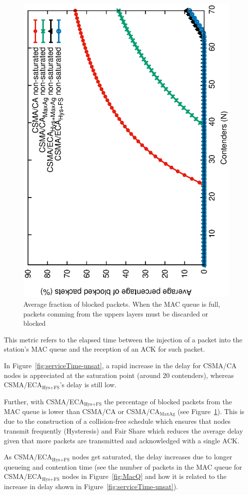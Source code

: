 	\begin{figure}[tb]
		\centering
		\includegraphics[width=0.7\linewidth,angle=-90]{figures/unsaturated/blockingProb-unsat/blocking-unsaturated-TON.eps}
		\caption{Average fraction of blocked packets. When the MAC queue is full, packets comming from the uppers layers must be discarded or blocked}
		\label{fig:blocked-packets}
	\end{figure}	
	
	This metric refers to the elapsed time between the injection of a packet into the station's MAC queue and the reception of an ACK for such packet. 
	
	In Figure~\ref{fig:serviceTime-unsat}, a rapid increase in the delay for CSMA/CA nodes is appreciated at the saturation point (around 20 contenders), whereas CSMA/ECA$_{\text{Hys+FS}}$'s delay is still low. 
	
	Further, with CSMA/ECA$_{\text{Hys+FS}}$ the percentage of blocked packets from the MAC queue is lower than CSMA/CA or CSMA/CA$_{\text{MaxAg}}$ (see Figure~\ref{fig:blocked-packets}). This is due to the construction of a collision-free schedule which ensures that nodes transmit frequently (Hysteresis) and Fair Share which reduces the average delay given that more packets are transmitted and acknowledged with a single ACK.
	
	As CSMA/ECA$_{\text{Hys+FS}}$ nodes get saturated, the delay increases due to longer queueing and contention time (see the number of packets in the MAC queue for CSMA/ECA$_{\text{Hys+FS}}$ nodes in Figure~\ref{fig:MacQ} and how it is related to the increase in delay shown in Figure~\ref{fig:serviceTime-unsat}).
	
